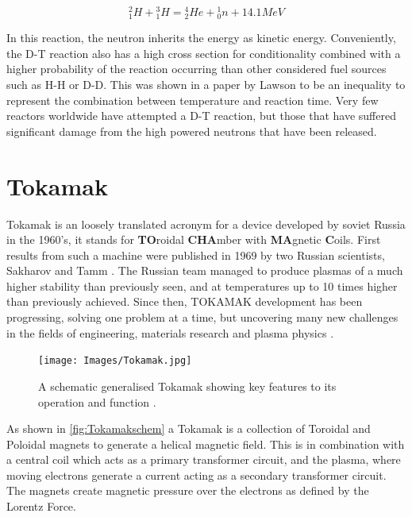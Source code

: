 \documentclass[12pt,a4paper,oneside]{report}
\begin{document}
\begin{equation}
{^{2}_{1}H} + {^{3}_{1}H} = {^{4}_{2}He} + {^{1}_{0}n} + 14.1MeV
\label{eq:D-T}
\end{equation}

In this reaction, the neutron inherits the energy as kinetic energy. Conveniently, the D-T reaction also has a high cross section for conditionality combined with a higher probability of the reaction occurring than other considered fuel sources such as H-H or D-D. This was shown in a paper by Lawson \cite{Christopherson1957SomeReactor} to be an inequality to represent the combination between temperature and reaction time. Very few reactors worldwide have attempted a D-T reaction, but those that have suffered significant damage from the high powered neutrons that have been released.

	\section{Tokamak}
Tokamak is an loosely translated acronym for a device developed by soviet Russia in the 1960's, it stands for \textbf{TO}roidal \textbf{CHA}mber with \textbf{MA}gnetic \textbf{C}oils. First results from such a machine were published in 1969 by two Russian scientists, Sakharov and Tamm \cite{Tamm1959TheoryI}. The Russian team managed to produce plasmas of a much higher stability than previously seen, and at temperatures up to 10 times higher than previously achieved. Since then, TOKAMAK development has been progressing, solving one problem at a time, but uncovering many new challenges in the fields of engineering, materials research and plasma physics \cite{Smirnov2010Tokamak19501990}.\\

\begin{figure}[H]
\texttt{[image: Images/Tokamak.jpg]}
\caption{A schematic generalised Tokamak showing key features to its operation and function \cite{TokamakEUROfusion}.}
\label{fig:Tokamakschem}
\end{figure}

As shown in \autoref{fig:Tokamakschem} a Tokamak is a collection of Toroidal and Poloidal magnets to generate a helical magnetic field. This is in combination with a central coil which acts as a primary transformer circuit, and the plasma, where moving electrons generate a current acting as a secondary transformer circuit. The magnets create magnetic pressure over the electrons as defined by the Lorentz Force.
\end{document}
